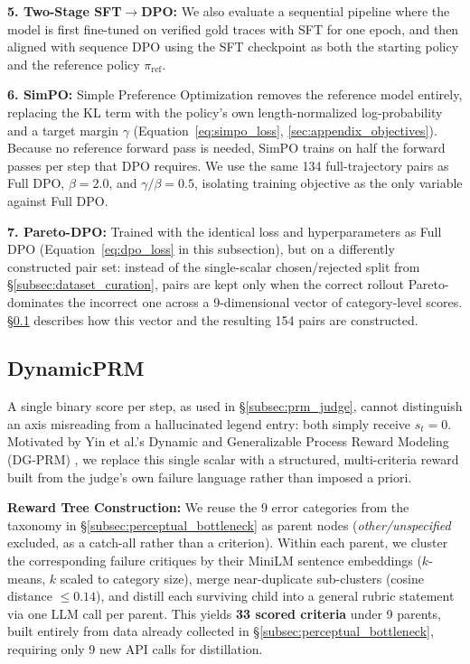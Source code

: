 \documentclass[11pt]{article}
\begin{document}
\textbf{5. Two-Stage SFT$\rightarrow$DPO:} We also evaluate a sequential pipeline where the model is first fine-tuned on verified gold traces with SFT for one epoch, and then aligned with sequence DPO using the SFT checkpoint as both the starting policy and the reference policy $\pi_{\text{ref}}$.

\textbf{6. SimPO:} Simple Preference Optimization \citep{meng2024simpo} removes the reference model entirely, replacing the KL term with the policy's own length-normalized log-probability and a target margin $\gamma$ (Equation~\ref{eq:simpo_loss}, \ref{sec:appendix_objectives}). Because no reference forward pass is needed, SimPO trains on half the forward passes per step that DPO requires. We use the same 134 full-trajectory pairs as Full DPO, $\beta = 2.0$, and $\gamma/\beta = 0.5$, isolating training objective as the only variable against Full DPO.

\textbf{7. Pareto-DPO:} Trained with the identical loss and hyperparameters as Full DPO (Equation~\ref{eq:dpo_loss} in this subsection), but on a differently constructed pair set: instead of the single-scalar chosen/rejected split from \S\ref{subsec:dataset_curation}, pairs are kept only when the correct rollout Pareto-dominates the incorrect one across a 9-dimensional vector of category-level scores. \S\ref{subsec:dynamic_prm} describes how this vector and the resulting 154 pairs are constructed.

\subsection{DynamicPRM}
\label{subsec:dynamic_prm}

A single binary score per step, as used in \S\ref{subsec:prm_judge}, cannot distinguish an axis misreading from a hallucinated legend entry: both simply receive $s_t = 0$. Motivated by Yin et al.'s Dynamic and Generalizable Process Reward Modeling (DG-PRM) \citep{yin2024dgprm}, we replace this single scalar with a structured, multi-criteria reward built from the judge's own failure language rather than imposed a priori.

\textbf{Reward Tree Construction:} We reuse the 9 error categories from the taxonomy in \S\ref{subsec:perceptual_bottleneck} as parent nodes (\textit{other/unspecified} excluded, as a catch-all rather than a criterion). Within each parent, we cluster the corresponding failure critiques by their MiniLM sentence embeddings ($k$-means, $k$ scaled to category size), merge near-duplicate sub-clusters (cosine distance $\le 0.14$), and distill each surviving child into a general rubric statement via one LLM call per parent. This yields \textbf{33 scored criteria} under 9 parents, built entirely from data already collected in \S\ref{subsec:perceptual_bottleneck}, requiring only 9 new API calls for distillation.
\end{document}
